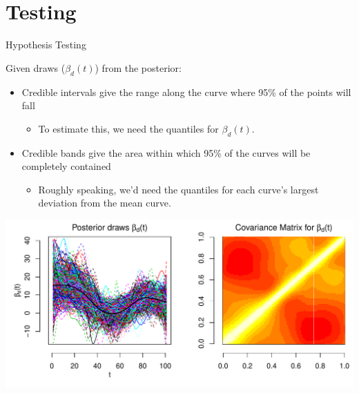 \documentclass[9 pt]{beamer}
\newcommand{\bi}{\begin{itemize}}
\newcommand{\ei}{\end{itemize}}
\newcommand{\ilist}[1]{\bi \item #1 \ei}
\begin{document}
\section*{Testing}
\begin{frame}{Hypothesis Testing}


Given draws ($\beta_d(t)$) from the posterior:
\bi
\item Credible intervals give the range along the curve where 95\% of the points will fall
\ilist{To estimate this, we need the quantiles for $\beta_d(t)$.}
\item Credible bands give the area within which 95\% of the curves will be completely contained
\ilist{Roughly speaking, we'd need the quantiles for each curve's largest deviation from the mean curve.}
\ei 

\includegraphics[scale=.5]{pics/Figure_BtDraws_&_Cov_C_35.pdf}

\end{frame}
\end{document}
